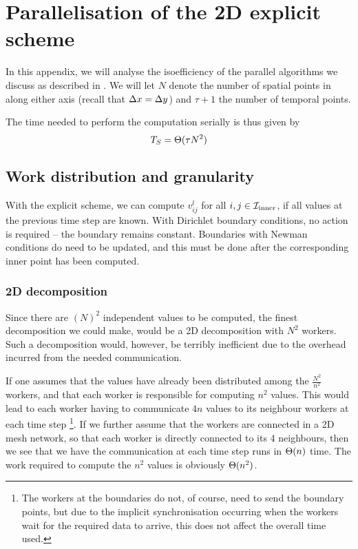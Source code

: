 
\section{Parallelisation of the 2D explicit scheme}
\label{appx:parallel}

In this appendix, we will analyse the isoefficiency of the parallel algorithms we discuss as described in \cite{inf3380_bok}. We will let $N$ denote the number of spatial points in along either axis (recall that ${\Delta x} = {\Delta y}$) and $\tau+1$ the number of temporal points.

The time needed to perform the computation serially is thus given by
\begin{equation}
T_S = \Theta(\tau N^2)
\end{equation}


\subsection{Work distribution and granularity}
With the explicit scheme, we can compute $v_{ij}^l$ for all $i, j \in \mathcal{I}_{\mathrm{inner}}$, if all values at the previous time step are known. With Dirichlet boundary conditions, no action is required -- the boundary remains constant. Boundaries with Newman conditions do need to be updated, and this must be done after the corresponding inner point has been computed.


\subsubsection{2D decomposition}
\label{appx:parallel:analysis:2d}
Since there are $(N)^2$ independent values to be computed, the finest decomposition we could make, would be a 2D decomposition with $N^2$ workers. Such a decomposition would, however, be terribly inefficient due to the overhead incurred from the needed communication.

If one assumes that the values have already been distributed among the $\frac{N^2}{n^2}$ workers, and that each worker is responsible for computing $n^2$ values. This would lead to each worker having to communicate $4n$ values to its neighbour workers at each time step \footnote{The workers at the boundaries do not, of course, need to send the boundary points, but due to the implicit synchronisation occurring when the workers wait for the required data to arrive, this does not affect the overall time used.}.
If we further assume that the workers are connected in a 2D mesh network, so that each worker is directly connected to its 4 neighbours, then we see that we have the communication at each time step runs in $\Theta (n)$ time. The work required to compute the $n^2$ values is obviously $\Theta(n^2)$.

